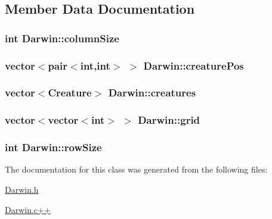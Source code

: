 \subsection{Member Data Documentation}
\hypertarget{classDarwin_a6e03335009de30948d204b1f9ca42037}{
\subsubsection[{column\-Size}]{\setlength{\rightskip}{0pt plus 5cm}int Darwin\-::column\-Size\hspace{0.3cm}{\ttfamily [private]}}}\label{classDarwin_a6e03335009de30948d204b1f9ca42037}
\hypertarget{classDarwin_ac2133bfd1983ef438cf956def041c3a1}{
\subsubsection[{creature\-Pos}]{\setlength{\rightskip}{0pt plus 5cm}vector$<$pair$<$int,int$>$ $>$ Darwin\-::creature\-Pos\hspace{0.3cm}{\ttfamily [private]}}}\label{classDarwin_ac2133bfd1983ef438cf956def041c3a1}
\hypertarget{classDarwin_a978b043fc31166158147808b599f2cc3}{
\subsubsection[{creatures}]{\setlength{\rightskip}{0pt plus 5cm}vector$<${\bf Creature}$>$ Darwin\-::creatures\hspace{0.3cm}{\ttfamily [private]}}}\label{classDarwin_a978b043fc31166158147808b599f2cc3}
\hypertarget{classDarwin_a8bf156a4c4224c22472df31bde83cb9a}{
\subsubsection[{grid}]{\setlength{\rightskip}{0pt plus 5cm}vector$<$vector$<$int$>$ $>$ Darwin\-::grid\hspace{0.3cm}{\ttfamily [private]}}}\label{classDarwin_a8bf156a4c4224c22472df31bde83cb9a}
\hypertarget{classDarwin_a2e5f75f838d4763c675240f0f4ed8018}{
\subsubsection[{row\-Size}]{\setlength{\rightskip}{0pt plus 5cm}int Darwin\-::row\-Size\hspace{0.3cm}{\ttfamily [private]}}}\label{classDarwin_a2e5f75f838d4763c675240f0f4ed8018}


The documentation for this class was generated from the following files\-:\begin{DoxyCompactItemize}
\item 
\hyperlink{Darwin_8h}{Darwin.\-h}\item 
\hyperlink{Darwin_8c_09_09}{Darwin.\-c++}\end{DoxyCompactItemize}
